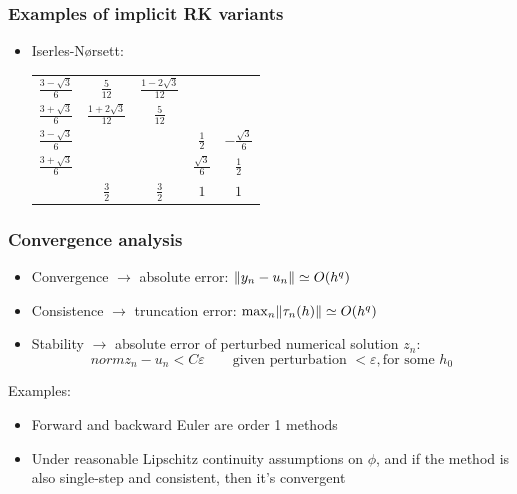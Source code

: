 \documentclass{beamer}
\begin{document}
\begin{frame} %
	\frametitle{Examples of implicit RK variants}
	\begin{itemize}
		\item Iserles-Nørsett:
		\begin{tabular}{c|cccc}
			$\frac{3-\sqrt{3}}{6}$ & $\frac{5}{12}$ & $\frac{1-2\sqrt{3}}{12}$ & & \\
			$\frac{3+\sqrt{3}}{6}$ & $\frac{1+2\sqrt{3}}{12}$ & $\frac{5}{12}$ & & \\
			$\frac{3-\sqrt{3}}{6}$ & & & $\frac{1}{2}$ & $-\frac{\sqrt{3}}{6}$ \\
			$\frac{3+\sqrt{3}}{6}$ & & & $\frac{\sqrt{3}}{6}$ & $\frac{1}{2}$ \\
			\hline
			& $\frac{3}{2}$ & $\frac{3}{2}$ & $1$ & $1$
			\end{tabular}
	\end{itemize}
\end{frame}


\begin{frame} %
	\frametitle{Convergence analysis}
	\begin{itemize}
		\item Convergence $\to$ absolute error: $\lVert y_n - u_n\rVert \simeq O(h^q)$
		\item Consistence $\to$ truncation error: $\max_n \lVert\tau_n(h)\rVert \simeq O(h^q)$
		\item Stability $\to$ absolute error of perturbed numerical solution $z_n$:
		$$ 	norm{z_n-u_n} < C \varepsilon \qquad
		\text{given perturbation } < \varepsilon, \text{for some } h_0 $$
	\end{itemize}
	\pause
	Examples:
	\begin{itemize}
		\item Forward and backward Euler are order 1 methods
		\item Under reasonable Lipschitz continuity assumptions on $\phi$, and if the method is also single-step and consistent, then it's convergent
	\end{itemize}
\end{frame}
\end{document}
